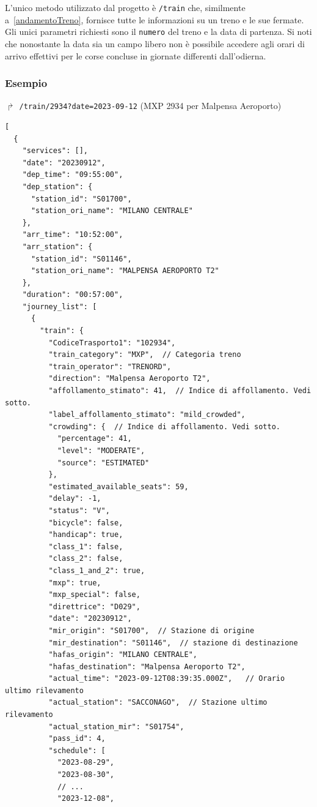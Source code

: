 \documentclass[12pt,italian]{report}
\begin{document}
L'unico metodo utilizzato dal progetto è \texttt{/train} che,
similmente a~\ref{andamentoTreno}, fornisce tutte le informazioni su
un treno e le sue fermate.  Gli unici parametri richiesti sono il
\texttt{numero} del treno e la data di partenza.  Si noti che
nonostante la data sia un campo libero non è possibile accedere agli
orari di arrivo effettivi per le corse concluse in giornate differenti
dall'odierna.

\subsubsection{Esempio}
$\Rsh$ \texttt{/train/2934?date=2023-09-12} \hfill (MXP 2934 per
Malpensa Aeroporto)
\begin{verbatim}
[
  {
    "services": [],
    "date": "20230912",
    "dep_time": "09:55:00",
    "dep_station": {
      "station_id": "S01700",
      "station_ori_name": "MILANO CENTRALE"
    },
    "arr_time": "10:52:00",
    "arr_station": {
      "station_id": "S01146",
      "station_ori_name": "MALPENSA AEROPORTO T2"
    },
    "duration": "00:57:00",
    "journey_list": [
      {
        "train": {
          "CodiceTrasporto1": "102934",
          "train_category": "MXP",  // Categoria treno
          "train_operator": "TRENORD",
          "direction": "Malpensa Aeroporto T2",
          "affollamento_stimato": 41,  // Indice di affollamento. Vedi sotto.
          "label_affollamento_stimato": "mild_crowded",
          "crowding": {  // Indice di affollamento. Vedi sotto.
            "percentage": 41,
            "level": "MODERATE",
            "source": "ESTIMATED"
          },
          "estimated_available_seats": 59,
          "delay": -1,
          "status": "V",
          "bicycle": false,
          "handicap": true,
          "class_1": false,
          "class_2": false,
          "class_1_and_2": true,
          "mxp": true,
          "mxp_special": false,
          "direttrice": "D029",
          "date": "20230912",
          "mir_origin": "S01700",  // Stazione di origine
          "mir_destination": "S01146",  // stazione di destinazione
          "hafas_origin": "MILANO CENTRALE",
          "hafas_destination": "Malpensa Aeroporto T2",
          "actual_time": "2023-09-12T08:39:35.000Z",   // Orario ultimo rilevamento
          "actual_station": "SACCONAGO",  // Stazione ultimo rilevamento
          "actual_station_mir": "S01754",
          "pass_id": 4,
          "schedule": [
            "2023-08-29",
            "2023-08-30",
            // ...
            "2023-12-08",

\end{verbatim}
\end{document}
